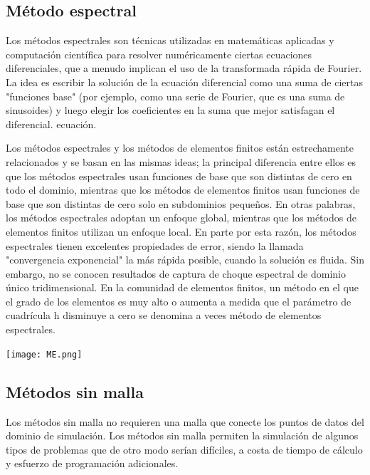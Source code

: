 \documentclass[12pt]{article}
\begin{document}
   
   \subsection{Método espectral}
   
   Los métodos espectrales son técnicas utilizadas en matemáticas aplicadas y computación científica para resolver numéricamente ciertas ecuaciones diferenciales, que a menudo implican el uso de la transformada rápida de Fourier. La idea es escribir la solución de la ecuación diferencial como una suma de ciertas "funciones base" (por ejemplo, como una serie de Fourier, que es una suma de sinusoides) y luego elegir los coeficientes en la suma que mejor satisfagan el diferencial. ecuación.

Los métodos espectrales y los métodos de elementos finitos están estrechamente relacionados y se basan en las mismas ideas; la principal diferencia entre ellos es que los métodos espectrales usan funciones de base que son distintas de cero en todo el dominio, mientras que los métodos de elementos finitos usan funciones de base que son distintas de cero solo en subdominios pequeños. En otras palabras, los métodos espectrales adoptan un enfoque global, mientras que los métodos de elementos finitos utilizan un enfoque local. En parte por esta razón, los métodos espectrales tienen excelentes propiedades de error, siendo la llamada "convergencia exponencial" la más rápida posible, cuando la solución es fluida. Sin embargo, no se conocen resultados de captura de choque espectral de dominio único tridimensional. En la comunidad de elementos finitos, un método en el que el grado de los elementos es muy alto o aumenta a medida que el parámetro de cuadrícula h disminuye a cero se denomina a veces método de elementos espectrales.

   
   \begin{center}
         \texttt{[image: ME.png]}
   \end{center}
   
   
  \subsection{Métodos sin malla}
   
  Los métodos sin malla no requieren una malla que conecte los puntos de datos del dominio de simulación. Los métodos sin malla permiten la simulación de algunos tipos de problemas que de otro modo serían difíciles, a costa de tiempo de cálculo y esfuerzo de programación adicionales.
\end{document}
